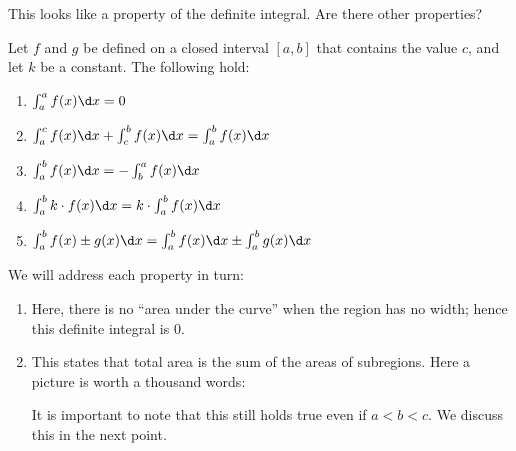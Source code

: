 \documentclass{ximera}
\begin{document}
This looks like a property of the definite integral. Are there other properties?

\begin{theorem}
Let $f$ and $g$ be defined on a closed interval $[a,b]$ that contains the
value $c$, and let $k$ be a constant. The following
hold:
\begin{enumerate}
\item $\int_a^a f(x)\d x = 0$
\item $\int_a^c f(x)\d x + \int_c^b f(x)\d x = \int_a^b f(x)\d x$
\item $\int_a^bf(x)\d x = -\int_b^a f(x)\d x$
\item $\int_a^bk\cdot f(x)\d x = k\cdot\int_a^bf(x)\d x$
\item $\int_a^b f(x)\pm g(x)\d x = \int_a^bf(x)\d x \pm \int_a^bg(x)\d x$
\end{enumerate}
\begin{explanation}
  We will address each property in turn:
\begin{enumerate}
\item Here, there is no ``area under the curve'' when the region has
  no width; hence this definite integral is $0$.
\item This states that total area is the sum of the areas of
  subregions. Here a picture is worth a thousand words:
  \begin{image}
  \end{image}		
  It is important to note that this still holds true even if
  $a<b<c$. We discuss this in the next point.
  

\end{enumerate}
\end{explanation}
\end{theorem}
\end{document}
